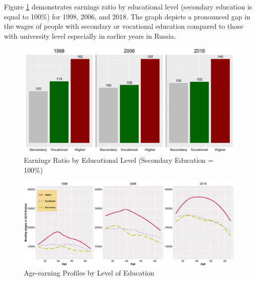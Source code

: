 \documentclass[alpha-refs]{wiley-article-01g}
\begin{document}
\vspace{-2em}
Figure \ref{fig:5.1} demonstrates earnings ratio by educational level (secondary education is equal to 100\%) for 1998, 2006, and 2018. The graph depicts a pronounced gap in the wages of people with secondary or vocational education compared to those with university level especially in earlier years in Russia.

\begin{center}
	\begin{figure}[htbp!]
\begin{minipage}[b]{1\linewidth}
			\centering
			\includegraphics[width=6in]{earnings_ratio.png}
		\end{minipage}
			\caption{Earnings Ratio by Educational Level (Secondary Education = 100\%)}\label{fig:5.1}
	\end{figure}
\end{center}

\vspace{-0.2in}

\begin{center}
	\begin{figure}[htbp!]
\begin{minipage}[b]{1\linewidth}
			\centering
			\hspace*{-0.3in}
			\includegraphics[width=6in]{earnings_by_level.png}
		\end{minipage}
			\caption{Age-earning Profiles by Level of Education}\label{fig:5.2}
	\end{figure}
\end{center}
\end{document}
